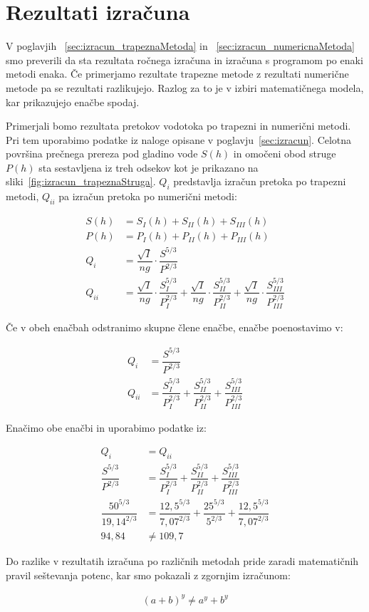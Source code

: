 \section{Rezultati izračuna}
V poglavjih ~\ref{sec:izracun_trapeznaMetoda} in ~\ref{sec:izracun_numericnaMetoda} smo preverili da sta rezultata ročnega izračuna in izračuna s programom po enaki metodi enaka. Če primerjamo rezultate trapezne metode z rezultati numerične metode pa se rezultati razlikujejo. Razlog za to je v izbiri matematičnega modela, kar prikazujejo enačbe spodaj.

Primerjali bomo rezultata pretokov vodotoka po trapezni in numerični metodi. Pri tem uporabimo podatke iz naloge opisane v poglavju~\ref{sec:izracun}. Celotna površina prečnega prereza pod gladino vode $S(h)$ in omočeni obod struge $P(h)$ sta sestavljena iz treh odsekov kot je prikazano na sliki~\ref{fig:izracun_trapeznaStruga}. $Q_i$ predstavlja izračun pretoka po trapezni metodi, $Q_{ii}$ pa izračun pretoka po numerični metodi:
\begin{ceqn}
\begin{align}
S(h)&= S_I(h) + S_{II}(h) + S_{III}(h)\\
P(h)&= P_I(h) + P_{II}(h) + P_{III}(h)\\
Q_i &= \dfrac{\sqrt{I}}{ng} \cdot \dfrac{S^{5/3}}{P^{2/3}} \\
Q_{ii} &= \dfrac{\sqrt{I}}{ng} \cdot \dfrac{S_I^{5/3}}{P_I^{2/3}} + \dfrac{\sqrt{I}}{ng} \cdot \dfrac{S_{II}^{5/3}}{P_{II}^{2/3}} + \dfrac{\sqrt{I}}{ng} \cdot \dfrac{S_{III}^{5/3}}{P_{III}^{2/3}}
\end{align}
\end{ceqn}

Če v obeh enačbah odstranimo skupne člene enačbe, enačbe poenostavimo v:

\begin{ceqn}
\begin{align}
Q_i &=\dfrac{S^{5/3}}{P^{2/3}}\\
Q_{ii} &= \dfrac{S_I^{5/3}}{P_I^{2/3}} + \dfrac{S_{II}^{5/3}}{P_{II}^{2/3}} + \dfrac{S_{III}^{5/3}}{P_{III}^{2/3}}
\end{align}
\end{ceqn}


Enačimo obe enačbi in uporabimo podatke iz:
\begin{ceqn}
\begin{align}
Q_i &= Q_{ii}\\
\dfrac{S^{5/3}}{P^{2/3}} &= \dfrac{S_I^{5/3}}{P_I^{2/3}} + \dfrac{S_{II}^{5/3}}{P_{II}^{2/3}} + \dfrac{S_{III}^{5/3}}{P_{III}^{2/3}}\\
\dfrac{50^{5/3}}{19,14^{2/3}} &= \dfrac{12,5^{5/3}}{7,07^{2/3}} + \dfrac{25^{5/3}}{5^{2/3}} + \dfrac{12,5^{5/3}}{7,07^{2/3}}\\
94,84 &\neq 109,7
\end{align}
\end{ceqn}


Do razlike v rezultatih izračuna po različnih metodah pride zaradi matematičnih pravil seštevanja potenc, kar smo pokazali z zgornjim izračunom:
\begin{ceqn}
\begin{align}
(a+b)^y \neq a^y + b^y
\end{align}
\end{ceqn}



